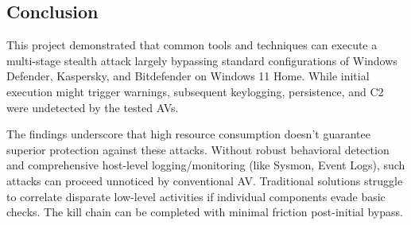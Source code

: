 \documentclass[11pt]{article}
\begin{document}
	\subsection{Conclusion}
	This project demonstrated that common tools and techniques can execute a multi-stage stealth attack largely bypassing standard configurations of Windows Defender, Kaspersky, and Bitdefender on Windows 11 Home. While initial execution might trigger warnings, subsequent keylogging, persistence, and C2 were undetected by the tested AVs.
	
	The findings underscore that high resource consumption doesn't guarantee superior protection against these attacks. Without robust behavioral detection and comprehensive host-level logging/monitoring (like Sysmon, Event Logs), such attacks can proceed unnoticed by conventional AV. Traditional solutions struggle to correlate disparate low-level activities if individual components evade basic checks. The kill chain can be completed with minimal friction post-initial bypass.
	
\end{document}
